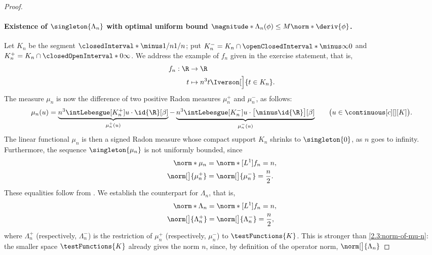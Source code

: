 \begin{proof}
\paragraph{Existence of $\singleton{\Lambda_n}$ with optimal uniform bound %
$\magnitude*{\Lambda_n(\phi)}\leq M \norm*{\deriv{\phi}}$.}%
Let $K_n$ be the segment $\closedInterval*{\minus 1/n}{1/n}$; put %
$K_n^{-} = K_n \cap \openClosedInterval*{\minus \infty}{0}$ and  $K_n^{+}=K_n \cap \closedOpenInterval*{0}{\infty}$.
We address the example of $f_n$ given in the exercise statement, that is, 
% 
\begin{align}
  f_n: \R &\to \R \\
        t &\mapsto n^3 t \Iverson[\Big]{t \in K_n}. \nonumber
\end{align}
% 
The measure $\mu_n$ is now the difference of two positive Radon measures $\mu_{n}^{+}$ and $\mu_n^-$, as follows: %
% 
\begin{equation}
  \mu_n(u) = 
    \underbrace{n^3 \intLebesgue[K_n^{+}]{u \cdot \id{\R}}[\beta]}_{\mu_n^{+}(u)} - 
    \underbrace{n^3 \intLebesgue[K_n^{-}]{u \cdot \bigl[\minus \id{\R}\bigr]}[\beta]}_{\mu_n^{-}(u)} %
    \qquad \bigl(u \in \continuous[c][][K]\bigr).
\end{equation} 
% 
The linear functional $\mu_n$ is then a signed Radon measure whose compact support $K_n$ shrinks to $\singleton{0}$, as %
$n$ goes to infinity. Furthermore, the sequence $\singleton{\mu_n}$ is not uniformly bounded, since 
% 
\begin{align}
  \norm*{\mu_n}   &= \norm*[L^1]{f_n}  = n, \label{2.3:norm-of-mu-n}  \\
  \norm[\big]{\mu_{n}^{+}} &= \norm[\big]{\mu_n^-} = \frac{n}{2}. %
    \label{2.3:existence-of-Lambda-with-optimal-uniform-bound:mu-n}
\end{align}
% 
These equalities follow from . We establish the counterpart for $\Lambda_n$, that is,
% 
\begin{align}
  \norm*{\Lambda_n} &= \norm*[L^1]{f_n}  = n,  \label{2.3:norm-of-lambda-n:1}\\
  \norm[\big]{\Lambda_{n}^{+}} &= \norm[\big]{\Lambda_n^-} = \frac{n}{2}, \label{2.3:norm-of-lambda-n:2}
\end{align}
% 
where $\Lambda_{n}^{+}$ (respectively, $\Lambda_n^-$) is the restriction of $\mu_{n}^{+}$ (respectively, $\mu_n^-$) to %
$\testFunctions{K}$. This is stronger than \eqref{2.3:norm-of-mu-n}: the smaller space $\testFunctions{K}$ already gives the %
norm $n$, since, by definition of the operator norm, $\norm[\big]{\Lambda_n}$ %

\end{proof}
